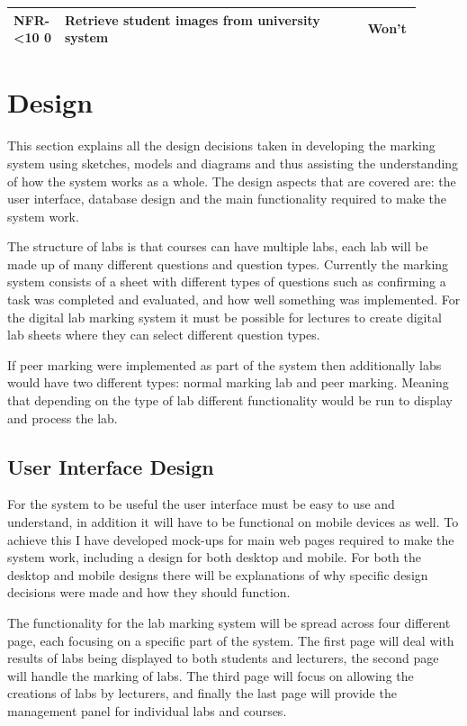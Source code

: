 \documentclass[11pt]{report}
\newcommand{\rid}[1]{\centering #1-\ifnum\value{requirement}<10 0\fi\arabic{requirement}
\stepcounter{requirement}}
\begin{document}
\begin{spacing}{1.25}
\begin{longtable}{|p{0.1\linewidth}|p{0.7\linewidth}|p{0.1\linewidth}|}
\rid{NFR} & Retrieve student images from university system & Won't\\ \hline

\end{longtable}
\end{spacing}
\setcounter{requirement}{1}





\newpage
\chapter{Design}
This section explains all the design decisions taken in developing the marking system using sketches, models and diagrams and thus assisting  the understanding of how the system works as a whole. The design aspects that are covered are: the user interface, database design and the main functionality required to make the system work. 

The structure of labs is that courses can have multiple labs, each lab will be made up of many different questions and question types. Currently the marking system consists of a sheet with different types of questions such as confirming a task was completed and evaluated, and how well something was implemented. For the digital lab marking system it must be possible for lectures to create digital lab sheets where they can select different question types. 

If peer marking were implemented as part of the system then additionally labs would have two different types: normal marking lab and peer marking. Meaning that depending on the type of lab different functionality would be run to display and process the lab.


\section{User Interface Design}
For the system to be useful the user interface must be easy to use and understand, in addition it will have to be functional on mobile devices as well. To achieve this I have developed mock-ups for main web pages required to make the system work, including a design for both desktop and mobile. For both the desktop and mobile designs there will be explanations of why specific design decisions were made and how they should function.

The functionality for the lab marking system will be spread across four different page, each focusing on a specific part of the system. The first page will deal with results of labs being displayed to both students and lecturers, the second page will handle the marking of labs. The third page will focus on allowing the creations of labs by lecturers, and finally the last page will provide the management panel for individual labs and courses.
\end{document}
